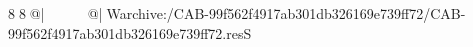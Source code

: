 8  8  @|                                                   @| W   archive:/CAB-99f562f4917ab301db326169e739ff72/CAB-99f562f4917ab301db326169e739ff72.resS 